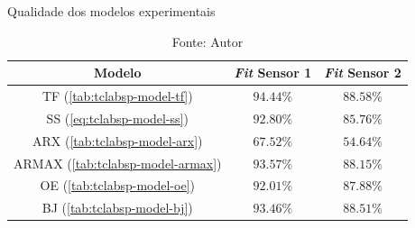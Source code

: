 \begin{table}[h]
	\centering
	\caption{Qualidade dos modelos experimentais}
	\label{tab:modelos_experimentais_fit}
	\begin{tabular}{c|cc} \toprule
		{Modelo}		                            &	{\textit{Fit} Sensor 1}	    &	{\textit{Fit} Sensor 2}			\\ \midrule
		TF (\cref{tab:tclabsp-model-tf})			&   $94.44\%$                   &   $88.58\%$                       \\
		SS (\cref{eq:tclabsp-model-ss})			    &   $92.80\%$                   &   $85.76\%$                       \\
		ARX	(\cref{tab:tclabsp-model-arx})		    &   $67.52\%$                   &   $54.64\%$                       \\
		ARMAX (\cref{tab:tclabsp-model-armax})		&   $93.57\%$                   &   $88.15\%$                       \\
		OE (\cref{tab:tclabsp-model-oe})			&   $92.01\%$                   &   $87.88\%$                       \\
		BJ (\cref{tab:tclabsp-model-bj})			&   $93.46\%$                   &   $88.51\%$                       \\ \bottomrule
	\end{tabular}
	\caption*{Fonte: Autor}
\end{table}